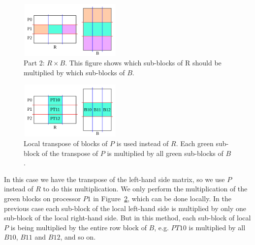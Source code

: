 \begin{figure}[tbh]
    \centering
    \includegraphics[width=5cm,height=2.8cm]{./figures/part2d.pdf}
    \caption{Part 2: $R \times B$. This figure shows which sub-blocks of R should be multiplied by which sub-blocks of $B$.}
    \label{fig:part2d}
    \Description{}
\end{figure}

\begin{figure}[tbh]
    \centering
    \includegraphics[width=5cm,height=2.8cm]{./figures/part2e.pdf}
    \caption{Local transpose of blocks of $P$ is used instead of $R$. Each green sub-block of the transpose of $P$ is multiplied by all green sub-blocks of $B$.}
    \label{fig:part2e}
    \Description{}
\end{figure}

In this case we have the transpose of the left-hand side matrix, so we use $P$ instead of $R$ to do this multiplication.
We only perform the multiplication of the green blocks on processor $P1$ in Figure~\ref{fig:part2e}, which can be done locally.
%
In the previous case each sub-block of the local left-hand side is multiplied by only one sub-block of the local right-hand side.
But in this method, each sub-block of local $P$ is being multiplied by the entire row block of $B$, e.g. $PT10$ is multiplied by all $B10$, $B11$ and $B12$, and so on.

